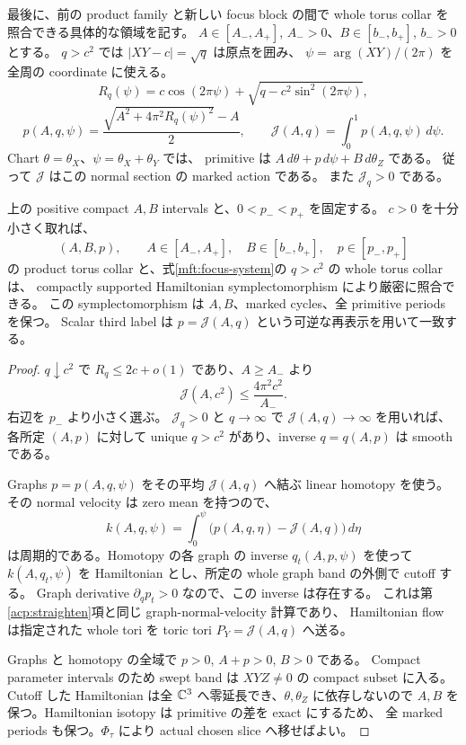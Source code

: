 最後に、前の product family と新しい focus block の間で
whole torus collar を照合できる具体的な領域を記す。
$A\in[A_-,A_+]$, $A_->0$、$B\in[b_-,b_+]$, $b_->0$ とする。
$q>c^2$ では $|XY-c|=\sqrt q$ は原点を囲み、
$\psi=\arg(XY)/(2\pi)$ を全周の coordinate に使える。
\[
 R_q(\psi)=c\cos(2\pi\psi)
       +\sqrt{q-c^2\sin^2(2\pi\psi)},
\]
\begin{equation}\label{mft:focus-action}
 p(A,q,\psi)
 =\frac{\sqrt{A^2+4\pi^2 R_q(\psi)^2}-A}{2},
 \qquad
 \mathcal J(A,q)=\int_0^1p(A,q,\psi)\,d\psi.
\end{equation}
Chart $\theta=\theta_X$、$\psi=\theta_X+\theta_Y$ では、
primitive は $A\,d\theta+p\,d\psi+B\,d\theta_Z$ である。
従って $\mathcal J$ はこの normal section の marked action である。
また $\mathcal J_q>0$ である。

\begin{proposition}
\label{mft:focus-collar}
上の positive compact $A,B$ intervals と、$0<p_-<p_+$ を固定する。
$c>0$ を十分小さく取れば、
\[
 (A,B,p),\qquad A\in[A_-,A_+],\quad B\in[b_-,b_+],
 \quad p\in[p_-,p_+]
\]
の product torus collar と、式\eqref{mft:focus-system}の $q>c^2$ の whole torus collar は、
compactly supported Hamiltonian symplectomorphism により厳密に照合できる。
この symplectomorphism は $A,B$、marked cycles、全 primitive periods を保つ。
Scalar third label は $p=\mathcal J(A,q)$ という可逆な再表示を用いて一致する。
\end{proposition}

\begin{proof}
$q\downarrow c^2$ で $R_q\le2c+o(1)$ であり、$A\ge A_-$ より
\[
 \mathcal J(A,c^2)\le\frac{4\pi^2c^2}{A_-}.
\]
右辺を $p_-$ より小さく選ぶ。
$\mathcal J_q>0$ と $q\to\infty$ で $\mathcal J(A,q)\to\infty$ を用いれば、
各所定 $(A,p)$ に対して unique $q>c^2$ があり、inverse $q=q(A,p)$ は smooth である。

Graphs $p=p(A,q,\psi)$ をその平均 $\mathcal J(A,q)$ へ結ぶ linear homotopy を使う。
その normal velocity は zero mean を持つので、
\[
 k(A,q,\psi)=\int_0^\psi
       \bigl(p(A,q,\eta)-\mathcal J(A,q)\bigr)\,d\eta
\]
は周期的である。Homotopy の各 graph の inverse $q_t(A,p,\psi)$ を使って
$k(A,q_t,\psi)$ を Hamiltonian とし、所定の whole graph band の外側で cutoff する。
Graph derivative $\partial_qp_t>0$ なので、この inverse は存在する。
これは第\ref{acp:straighten}項と同じ graph-normal-velocity 計算であり、
Hamiltonian flow は指定された whole tori を toric tori
$P_Y=\mathcal J(A,q)$ へ送る。

Graphs と homotopy の全域で $p>0$, $A+p>0$, $B>0$ である。
Compact parameter intervals のため swept band は $XYZ\ne0$ の compact subset に入る。
Cutoff した Hamiltonian は全 $\mathbb C^3$ へ零延長でき、$\theta,\theta_Z$ に依存しないので
$A,B$ を保つ。Hamiltonian isotopy は primitive の差を exact にするため、
全 marked periods も保つ。$\Phi_\tau$ により actual chosen slice へ移せばよい。
\end{proof}

